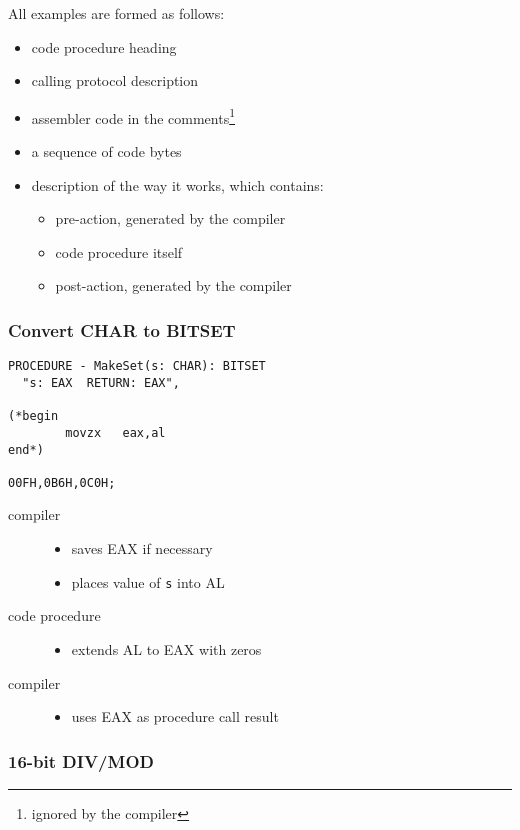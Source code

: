 All examples are formed as follows:
\begin{itemize}
\item code procedure heading
\item calling protocol description
\item assembler code in the comments\footnote{ignored by the compiler}
\item a sequence of code bytes
\item description of the way it works, which contains:
\begin{itemize}
        \item pre-action, generated by the compiler
        \item code procedure itself
        \item post-action, generated by the compiler
\end{itemize}
\end{itemize}

\subsubsection{Convert CHAR to BITSET}

\begin{verbatim}
PROCEDURE - MakeSet(s: CHAR): BITSET
  "s: EAX  RETURN: EAX",

(*begin
        movzx   eax,al
end*)

00FH,0B6H,0C0H;
\end{verbatim}

\begin{description}
\item[compiler] \mbox{}
   \begin{itemize}
     \item saves EAX if necessary
     \item places value of {\tt s} into AL
   \end{itemize}
\item[code procedure] \mbox{}
   \begin{itemize}
   \item extends AL to EAX with zeros
   \end{itemize}
\item[compiler] \mbox{}
   \begin{itemize}
   \item uses EAX as procedure call result
   \end{itemize}
\end{description}

\subsubsection{16-bit DIV/MOD}


